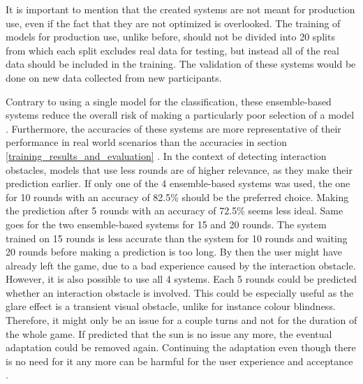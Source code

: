 It is important to mention that the created systems are not meant for production use, even if the fact that they are not optimized is overlooked. The training of models for production use, unlike before, should not be divided into 20 splits from which each split excludes real data for testing, but instead all of the real data should be included in the training. The validation of these systems would be done on new data collected from new participants. 

Contrary to using a single model for the classification, these ensemble-based systems reduce the overall risk of making a particularly poor selection of a model \cite[p.~22]{ebs}. Furthermore, the accuracies of these systems are more representative of their performance in real world scenarios than the accuracies in section \ref{training_results_and_evaluation} . In the context of detecting interaction obstacles, models that use less rounds are of higher relevance, as they make their prediction earlier. If only one of the 4 ensemble-based systems was used, the one for 10 rounds with an accuracy of 82.5\% should be the preferred choice. Making the prediction after 5 rounds with an accuracy of 72.5\% seems less ideal. Same goes for the two ensemble-based systems for 15 and 20 rounds. The system trained on 15 rounds is less accurate than the system for 10 rounds and waiting 20 rounds before making a prediction is too long. By then the user might have already left the game, due to a bad experience caused by the interaction obstacle. However, it is also possible to use all 4 systems. Each 5 rounds could be predicted whether an interaction obstacle is involved. This could be especially useful as the glare effect is a transient visual obstacle, unlike for instance colour blindness. Therefore, it  might only be an issue for a couple turns and not for the duration of the whole game. If predicted that the sun is no issue any more, the eventual adaptation could be removed again. Continuing the adaptation even though there is no need for it any more can be harmful for the user experience and acceptance \cite[p.~1]{blind}.

